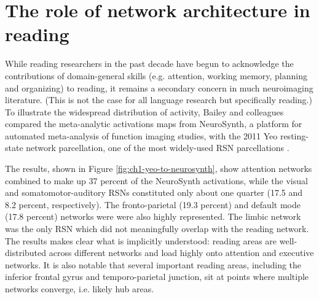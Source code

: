 \section{The role of network architecture in reading}

While reading researchers in the past decade have begun to acknowledge the contributions of domain-general skills (e.g. attention, working memory, planning and organizing) to reading, it remains a secondary concern in much neuroimaging literature. (This is not the case for all language research but specifically reading.) To illustrate the widespread distribution of activity, Bailey and colleagues compared the meta-analytic activations maps from NeuroSynth, a platform for automated meta-analysis of function imaging studies, with the 2011 Yeo resting-state network parcellation, one of the most widely-used RSN parcellations \citep{Bailey2018, Yarkoni2008a, Yeo2011}. 

The results, shown in Figure \ref{fig:ch1-yeo-to-neurosynth}, show attention networks combined to make up 37 percent of the NeuroSynth activations, while the visual and somatomotor-auditory RSNs constituted only about one quarter (17.5 and 8.2 percent, respectively). The fronto-parietal (19.3 percent) and default mode (17.8 percent) networks were were also highly represented. The limbic network was the only RSN which did not meaningfully overlap with the reading network. The results makes clear what is implicitly understood: reading areas are well-distributed across different networks and load highly onto attention and executive networks. It is also notable that several important reading areas, including the inferior frontal gyrus and temporo-parietal junction, sit at points where multiple networks converge, i.e. likely hub areas.

